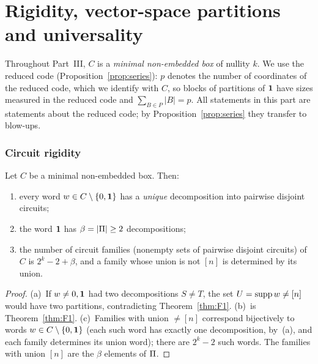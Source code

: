 \part{Rigidity, vector-space partitions and universality}

Throughout Part~III, $C$ is a \emph{minimal non-embedded box} of nullity $k$. We use the reduced code (Proposition~\ref{prop:series}): $p$ denotes the number of coordinates of the reduced code, which we identify with $C$, so blocks of partitions of $\mathbf 1$ have sizes measured in the reduced code and $\sum_{B\in P}|B|=p$. All statements in this part are statements about the reduced code; by Proposition~\ref{prop:series} they transfer to blow-ups.

\section{Circuit rigidity}\label{sec:rigidity}

\begin{theorem}\label{thm:rigid}
Let $C$ be a minimal non-embedded box. Then:
\begin{enumerate}[label=(\alph*)]
\item every word $w\in C\setminus\{0,\mathbf 1\}$ has a \emph{unique} decomposition into pairwise disjoint circuits;
\item the word $\mathbf 1$ has $\beta=|\Pi|\ge2$ decompositions;
\item the number of circuit families (nonempty sets of pairwise disjoint circuits) of $C$ is $2^k-2+\beta$, and a family whose union is not $[n]$ is determined by its union.
\end{enumerate}
\end{theorem}

\begin{proof}
(a)~If $w\ne0,\mathbf 1$ had two decompositions $S\ne T$, the set $U=\operatorname{supp} w\ne[n]$ would have two partitions, contradicting Theorem~\ref{thm:F1}. (b)~is Theorem~\ref{thm:F1}. (c)~Families with union $\ne[n]$ correspond bijectively to words $w\in C\setminus\{0,\mathbf 1\}$ (each such word has exactly one decomposition, by~(a), and each family determines its union word); there are $2^k-2$ such words. The families with union $[n]$ are the $\beta$ elements of $\Pi$.
\end{proof}

